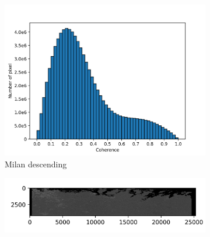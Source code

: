 \documentclass[preprint, authoryear]{elsarticle}
\begin{document}
\begin{figure}
\begin{subfigure}{0.5\textwidth}
\begin{minipage}{0.5\textwidth}
        \end{minipage}%
        \begin{minipage}{0.5\textwidth}
            \centering
            \includegraphics[width=\textwidth]{figure/The coherence/coh_Milan_des_esd1_histogram_.png}
        \end{minipage}
        \caption{Milan descending}
        \label{fig_6g}
    \end{subfigure}%
    \hfill
    \begin{subfigure}{0.5\textwidth}
        \centering
        \begin{minipage}{0.5\textwidth}
            \centering
            \includegraphics[width=\textwidth]{figure/The coherence/coh_Finland_asc_esd1.png}
        \end{minipage}%
        \begin{minipage}{0.5\textwidth}
            \centering

\end{minipage}
\end{subfigure}
\end{figure}
\end{document}

